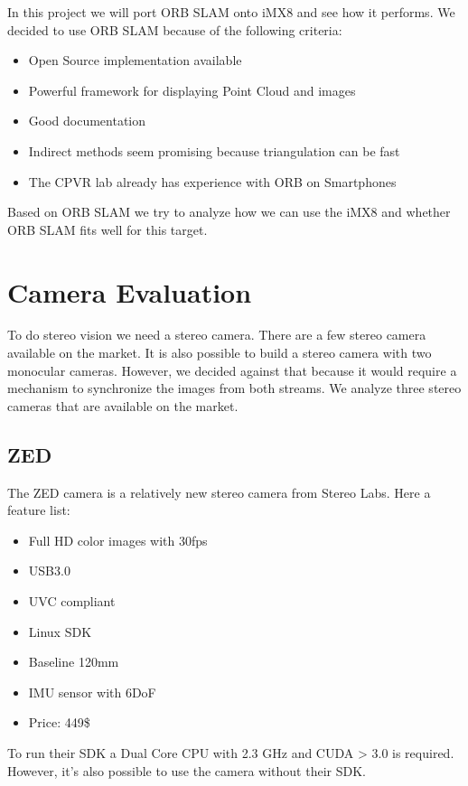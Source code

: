 \documentclass[11pt,a4paper,titlepage,oneside]{report}
\begin{document}
In this project we will port ORB SLAM onto iMX8 and see how it performs. We decided to use ORB SLAM because of the following criteria:
\begin{itemize}
	\item Open Source implementation available
	\item Powerful framework for displaying Point Cloud and images
	\item Good documentation
	\item Indirect methods seem promising because triangulation can be fast
	\item The CPVR lab already has experience with ORB on Smartphones
\end{itemize}

Based on ORB SLAM we try to analyze how we can use the iMX8 and whether ORB SLAM fits well for this target.

\chapter{Camera Evaluation}

To do stereo vision we need a stereo camera. There are a few stereo camera available on the market. It is also possible to build a stereo camera with two monocular cameras. However, we decided against that because it would require a mechanism to synchronize the images from both streams. We analyze three stereo cameras that are available on the market.

\section{ZED}
The ZED camera is a relatively new stereo camera from Stereo Labs. Here a feature list:
\begin{itemize}
	\item Full HD color images with 30fps
	\item USB3.0
	\item UVC compliant
	\item Linux SDK
	\item Baseline 120mm
	\item IMU sensor with 6DoF
	\item Price: 449\$
\end{itemize}

To run their SDK a Dual Core CPU with 2.3 GHz and CUDA > 3.0 is required. However, it's also possible to use the camera without their SDK.
\end{document}
